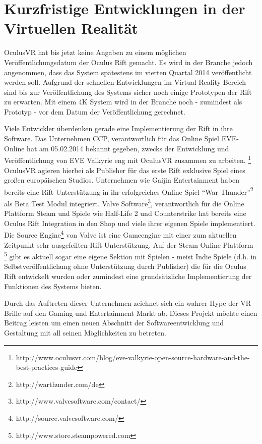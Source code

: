 \documentclass[pagesize, paper=a4, fontsize=12pt,titlepage=true, headings=small, headnosepline, abstractoff, liststotoc, nochapterprefix, plainheadsepline, twoside]{scrreprt}
\begin{document}
\chapter{Kurzfristige Entwicklungen in der Virtuellen Realität}
OculusVR hat bis jetzt keine Angaben zu einem möglichen Veröffentlichungsdatum der Oculus Rift gemacht. Es wird in der Branche jedoch angenommen, dass das System spätestens im vierten Quartal 2014 veröffentlicht werden soll. Aufgrund der schnellen Entwicklungen im Virtual Reality Bereich sind bis zur Veröffentlichung des Systems sicher noch einige Prototypen der Rift zu erwarten. Mit einem 4K System wird in der Branche noch - zumindest als Prototyp - vor dem Datum der Veröffentlichung gerechnet.

Viele Entwickler überdenken gerade eine Implementierung der Rift in ihre Software. Das Unternehmen CCP, verantwortlich für das Online Spiel EVE-Online hat am 05.02.2014 bekannt gegeben, zwecks der Entwicklung und Veröffentlichung von EVE Valkyrie eng mit OculusVR zusammen zu arbeiten. \footnote{http://www.oculusvr.com/blog/eve-valkyrie-open-source-hardware-and-the-best-practices-guide} OculusVR agieren hierbei als Publisher für das erste Rift exklusive Spiel eines großen europäischen Studios. Unternehmen wie Gaijin Entertainment haben bereits eine Rift Unterstützung in ihr erfolgreiches Online Spiel "`War Thunder"'\footnote{http://warthunder.com/de} als Beta Test Modul integriert. Valve Software\footnote{http://www.valvesoftware.com/contact/}, verantwortlich für die Online Plattform Steam und Spiele wie Half-Life 2 \cite{HalfLife2} und Counterstrike \cite{Counterstrike} hat bereits eine Oculus Rift Integration in den Shop und viele ihrer eigenen Spiele implementiert. Die Source Engine\footnote{http://source.valvesoftware.com/} von Valve ist eine Gameengine mit einer zum aktuellen Zeitpunkt sehr ausgefeilten Rift Unterstützung. Auf der Steam Online Plattform \footnote{http://www.store.steampowered.com} gibt es aktuell sogar eine eigene Sektion mit Spielen - meist Indie Spiele (d.h. in Selbstveröffentlichung ohne Unterstützung durch Publisher) die für die Oculus Rift entwickelt wurden oder zumindest eine grundsätzliche Implementierung der Funktionen des Systems bieten.

Durch das Auftreten dieser Unternehmen zeichnet sich ein wahrer Hype der VR Brille auf den Gaming und Entertainment Markt ab. Dieses Projekt möchte einen Beitrag leisten um einen neuen Abschnitt der Softwareentwicklung und Gestaltung mit all seinen Möglichkeiten zu betreten.
\end{document}
